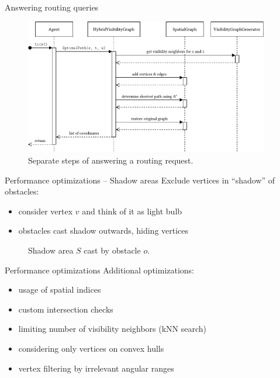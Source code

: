 \documentclass[xcolor={x11names}]{beamer}
\renewcommand{\n}{\hfill\\[0.5ex]}
\newenvironment{figcenter}
{%
	\parskip=0pt%
	\par%
	\nopagebreak%
	\centering%
}%
{%
	\par%
	\noindent%
	\ignorespacesafterend%
}
\begin{document}
		\begin{frame}{Answering routing queries}
			\begin{figure}[t]
				\begin{figcenter}
					\includegraphics[width=0.95\textwidth]{images/components-sequence-routing-short.pdf}
				\end{figcenter}
				\caption{Separate steps of answering a routing request.}
			\end{figure}
		\end{frame}
		
		\begin{frame}{Performance optimizations -- Shadow areas}
			Exclude vertices in \enquote{shadow} of obstacles:\n
			\begin{itemize}
				\item consider vertex $v$ and think of it as light bulb
				\item obstacles cast shadow outwards, hiding vertices
			\end{itemize}
			\begin{figure}[b]
				\begin{figcenter}
					\scalebox{0.7}
					{
						
					}
				\end{figcenter}
				\caption{Shadow area $S$ cast by obstacle $o$.}
			\end{figure}
		\end{frame}
		
		\begin{frame}{Performance optimizations}
			Additional optimizations:
			\begin{itemize}
				\item usage of spatial indices
				\item custom intersection checks
				\item limiting number of visibility neighbors (kNN search)
				\item considering only vertices on convex hulls
				\item vertex filtering by irrelevant angular ranges
			\end{itemize}
		\end{frame}
	
\end{document}
